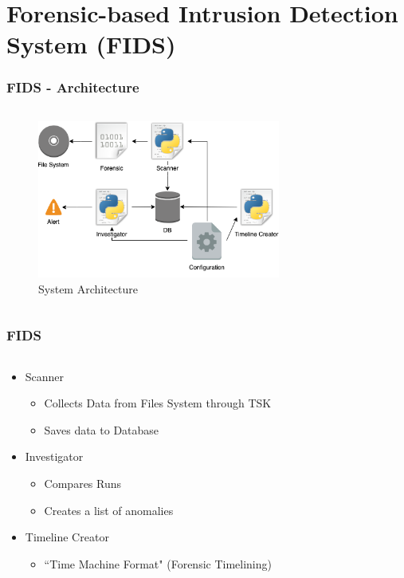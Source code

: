 \documentclass{beamer}
\begin{document}
\section{Forensic-based Intrusion Detection System (FIDS)}


\begin{frame}[fragile]
  \frametitle{FIDS - Architecture}
  \begin{columns}
    \begin{column}{1\textwidth}
      \begin{figure}[ht]
        \includegraphics[width=8cm]{../img/Overview_FIDS.png}
        \centering
        \caption{System Architecture}
        \label{fig:systemArchitecture}
      \end{figure}
    \end{column}
  \end{columns}
\end{frame}

\begin{frame}[fragile]
  \frametitle{FIDS}
  \begin{columns}
    \begin{column}{1\textwidth}
      \begin{itemize}
        \item Scanner
        \begin{itemize}
          \item Collects Data from Files System through TSK
          \item Saves data to Database
        \end{itemize}
        \item Investigator
        \begin{itemize}
          \item Compares Runs
          \item Creates a list of anomalies
        \end{itemize}
        \item Timeline Creator
        \begin{itemize}
          \item ``Time Machine Format" (Forensic Timelining)
        \end{itemize}
      \end{itemize}
    \end{column}
  \end{columns}
\end{frame}
\end{document}
